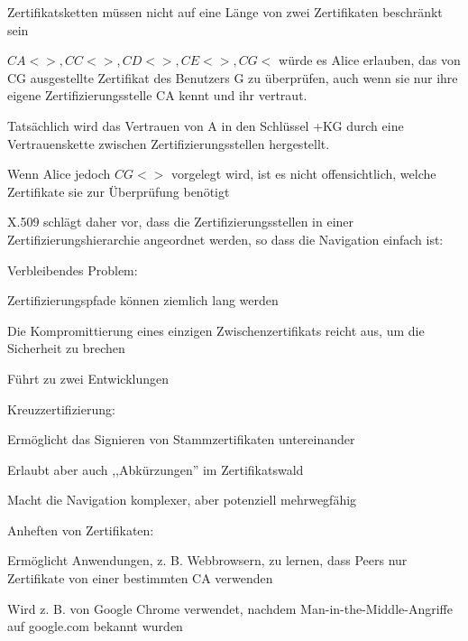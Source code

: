 \documentclass[a4paper]{article}
\begin{document}
\begin{multicols}{3}
\begin{itemize*}
            \item Zertifikatsketten müssen nicht auf eine Länge von zwei Zertifikaten beschränkt sein
            \begin{itemize*}
                  \item $CA<>, CC<>, CD<>, CE<>, CG<$ würde es Alice erlauben, das von CG ausgestellte Zertifikat des Benutzers G zu überprüfen, auch wenn sie nur ihre eigene Zertifizierungsstelle CA kennt und ihr vertraut.
                  \item Tatsächlich wird das Vertrauen von A in den Schlüssel +KG durch eine Vertrauenskette zwischen Zertifizierungsstellen hergestellt.
                  \item Wenn Alice jedoch $CG<>$ vorgelegt wird, ist es nicht offensichtlich, welche Zertifikate sie zur Überprüfung benötigt
            \end{itemize*}
            \item X.509 schlägt daher vor, dass die Zertifizierungsstellen in einer Zertifizierungshierarchie angeordnet werden, so dass die Navigation einfach ist:
            \item Verbleibendes Problem:
            \begin{itemize*}
                  \item Zertifizierungspfade können ziemlich lang werden
                  \item Die Kompromittierung eines einzigen Zwischenzertifikats reicht aus, um die Sicherheit zu brechen
            \end{itemize*}
            \item Führt zu zwei Entwicklungen
            \begin{itemize*}
                  \item Kreuzzertifizierung:
                  \begin{itemize*}
                        \item Ermöglicht das Signieren von Stammzertifikaten untereinander
                        \item Erlaubt aber auch ,,Abkürzungen'' im Zertifikatswald
                        \item Macht die Navigation komplexer, aber potenziell mehrwegfähig
                  \end{itemize*}
                  \item Anheften von Zertifikaten:
                  \begin{itemize*}
                        \item Ermöglicht Anwendungen, z. B. Webbrowsern, zu lernen, dass Peers nur Zertifikate von einer bestimmten CA verwenden
                        \item Wird z. B. von Google Chrome verwendet, nachdem Man-in-the-Middle-Angriffe auf google.com bekannt wurden
                  \end{itemize*}
            \end{itemize*}
      \end{itemize*}


\end{multicols}
\end{document}

